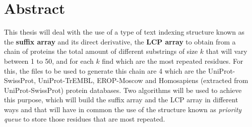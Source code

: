 \chapter*{Abstract}

This thesis will deal with the use of a type of text indexing structure known as the \textbf {suffix array} and its direct derivative, the \textbf{LCP array} to obtain from a chain of proteins the total amount of different substrings of size $k$ that will vary between 1 to 50, and for each $k$ find which are the most repeated residues. For this, the files to be used to generate this chain are 4 which are the UniProt-SwissProt, UniProt-TrEMBL, EROP-Moscow and Homosapiens (extracted from UniProt-SwissProt) protein databases. Two algorithms will be used to achieve this purpose, which will build the suffix array and the LCP array in different ways and that will have in common the use of the structure known as \textit{priority queue} to store those residues that are most repeated.